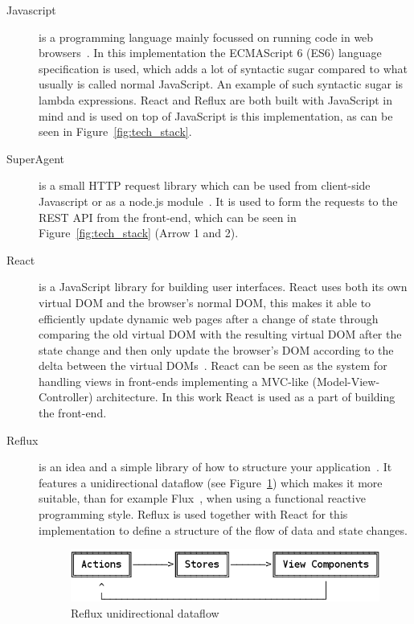\documentclass[a4paper,12pt]{article}
\begin{document}
\begin{description}

\item[Javascript]
is a programming language mainly focussed on running code in web browsers~\cite{JAVASCRIPT}. In this
implementation the ECMAScript 6 (ES6) language specification is used, which adds a lot of syntactic
sugar compared to what usually is called normal JavaScript. An example of such syntactic sugar is
lambda expressions. React and Reflux are both built with JavaScript in mind and is used on top of
JavaScript is this implementation, as can be seen in Figure~\ref{fig:tech_stack}. 

\item[SuperAgent]
is a small HTTP request library which can be used from client-side Javascript or as a node.js
module~\cite{SUPERAGENT}. It is used to form the requests to the REST API from the front-end, which
can be seen in Figure~\ref{fig:tech_stack} (Arrow 1 and 2).

\item[React]
is a JavaScript library for building user interfaces. React uses both its own virtual DOM and
the browser's normal DOM, this makes it able to efficiently update dynamic web pages after a change
of state through comparing the old virtual DOM with the resulting virtual DOM after the state change
and then only update the browser's DOM according to the delta between the virtual DOMs~\cite{REACT}.
React can be seen as the system for handling views in front-ends implementing a MVC-like
(Model-View-Controller) architecture. In this work React is used as a part of building the
front-end.

\item[Reflux] 
is an idea and a simple library of how to structure your application~\cite{REFLUX}. It features a
unidirectional dataflow (see Figure~\ref{fig:reflux}) which makes it more suitable, than for example
Flux~\cite{FLUX}, when using a functional reactive programming style. Reflux is used together with
React for this implementation to define a structure of the flow of data and state changes.

\begin{figure}[H] 
    \centering
    \includegraphics[scale=0.4]{reflux.png}
    \caption{Reflux unidirectional dataflow}
    \label{fig:reflux}
\end{figure}


\end{description}
\end{document}

